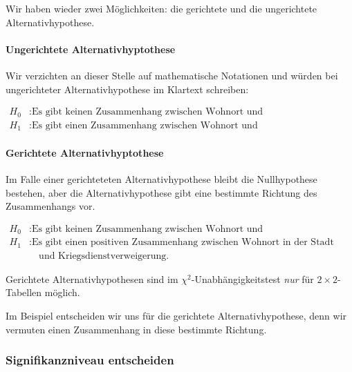 \documentclass[
  ngerman,
]{article}
\begin{document}
Wir haben wieder zwei Möglichkeiten: die gerichtete und die ungerichtete Alternativhypothese.

\hypertarget{ungerichtete-alternativhyptothese}{%
\paragraph{Ungerichtete Alternativhyptothese}\label{ungerichtete-alternativhyptothese}}

Wir verzichten an dieser Stelle auf mathematische Notationen und würden bei ungerichteter Alternativhypothese im Klartext schreiben:

\[\begin{aligned}
H_0 &: \textrm{Es gibt keinen Zusammenhang zwischen Wohnort und Verweigerungsentscheidung.}\\
H_1 &: \textrm{Es gibt einen Zusammenhang zwischen Wohnort und Verweigerungsentscheidung.}
\end{aligned}\]

\hypertarget{gerichtete-alternativhyptothese}{%
\paragraph{Gerichtete Alternativhyptothese}\label{gerichtete-alternativhyptothese}}

Im Falle einer gerichteteten Alternativhypothese bleibt die Nullhypothese bestehen, aber die Alternativhypothese gibt eine bestimmte Richtung des Zusammenhangs vor.

\[\begin{aligned}
H_0 &: \textrm{Es gibt keinen Zusammenhang zwischen Wohnort und Verweigerungsentscheidung.}\\
H_1 &: \textrm{Es gibt einen positiven Zusammenhang zwischen Wohnort in der Stadt} \\
&\quad\textrm{und Kriegsdienstverweigerung.}
\end{aligned}\]

Gerichtete Alternativhypothesen sind im \(\chi^2\)-Unabhängigkeitstest \emph{nur} für \(2\times2\)-Tabellen möglich.

Im Beispiel entscheiden wir uns für die gerichtete Alternativhypothese, denn wir vermuten einen Zusammenhang in diese bestimmte Richtung.

\hypertarget{signifikanzniveau-entscheiden-4}{%
\subsubsection{Signifikanzniveau entscheiden}\label{signifikanzniveau-entscheiden-4}}
\end{document}
